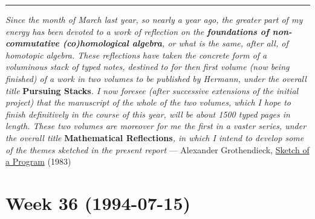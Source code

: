 \documentclass{article}
\renewcommand{\texttt}[1]{%
  \begingroup
  \ttfamily
  \begingroup\lccode`~=`/\lowercase{\endgroup\def~}{/\discretionary{}{}{}}%
  \begingroup\lccode`~=`[\lowercase{\endgroup\def~}{[\discretionary{}{}{}}%
  \begingroup\lccode`~=`.\lowercase{\endgroup\def~}{.\discretionary{}{}{}}%
  \catcode`/=\active\catcode`[=\active\catcode`.=\active
  \scantokens{#1\noexpand}%
  \endgroup
}
\begin{document}

\begin{center}\rule{0.5\linewidth}{0.5pt}\end{center}

\emph{Since the month of March last year, so nearly a year ago, the
greater part of my energy has been devoted to a work of reflection on
the \textbf{foundations of non-commutative (co)homological algebra}, or
what is the same, after all, of homotopic algebra. These reflections
have taken the concrete form of a voluminous stack of typed notes,
destined to for then first volume (now being finished) of a work in two
volumes to be published by Hermann, under the overall title}
\textbf{Pursuing Stacks}\emph{. I now foresee (after successive
extensions of the initial project) that the manuscript of the whole of
the two volumes, which I hope to finish definitively in the course of
this year, will be about 1500 typed pages in length. These two volumes
are moreover for me the first in a vaster series, under the overall
title} \textbf{Mathematical Reflections}\emph{, in which I intend to
develop some of the themes sketched in the present report} --- Alexander
Grothendieck, \href{http://www.grothendieckcircle.org/}{Sketch of a
Program} (1983)
\hypertarget{week36}{%
\section{Week 36 (1994-07-15)}\label{week36}}
\end{document}
